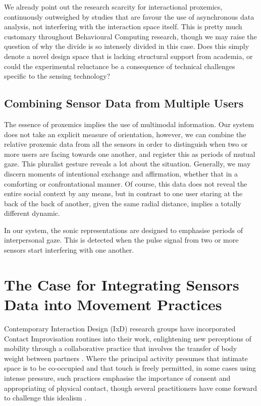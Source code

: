 We already point out the research scarcity for interactional proxemics, continuously outweighed by studies that are favour the use of asynchronous data analysis, not interfering with the interaction space itself.  This is pretty much customary throughout Behavioural Computing research, though we may raise the question of why the divide is so intensely divided in this case. Does this simply   denote a novel design space that is lacking structural support from academia, or could the experimental reluctance be a consequence of technical challenges specific to the sensing technology?

\subsection{Combining Sensor Data from Multiple Users}

The essence of proxemics implies the use of multimodal information. Our system does not take an explicit measure of orientation, however, we can combine the relative proxemic data from all the sensors in order to distinguish when two or more users are facing towards one another, and register this as periods of mutual gaze. This pluralist gesture reveals a lot about the situation. Generally, we may discern moments of intentional exchange and affirmation, whether that in a comforting or confrontational manner. Of course, this data does not reveal the entire social context by any means, but in contrast to one user staring at the back of the back of another, given the same radial distance, implies a totally different dynamic.

In our system, the sonic representations are designed to emphasise periods of interpersonal gaze. This is detected when the pulse signal from two or more sensors start interfering with one another. 

\section{The Case for Integrating Sensors Data into Movement Practices}

Contemporary Interaction Design (IxD) research groups have incorporated Contact Improvisation routines into their work, enlightening new perceptions of mobility through a collaborative practice that involves the transfer of body weight between partners \cite{bomba_somacoustics_2019, barrero_gonzalez_dance_2019}. Where the principal activity presumes that intimate space is to be co-occupied and that touch is freely permitted, in some cases using intense pressure, such practices emphasise the importance of consent and appropriating of physical contact, though several practitioners have come forward to challenge this idealism \cite{tai_exploring_2017,beaulieux_how_2019}.

